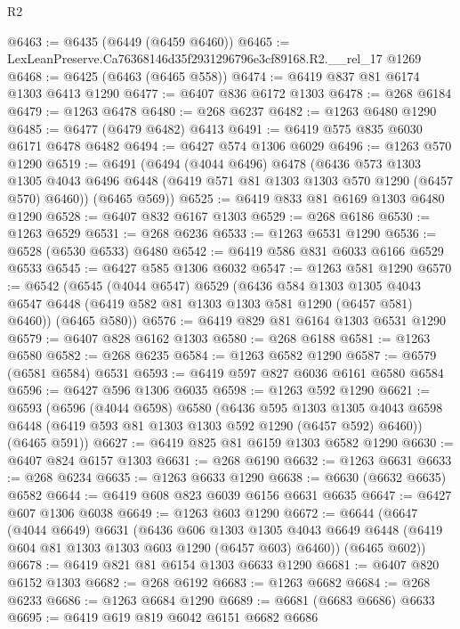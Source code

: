 \begin{lexlean}{R2}
\begin{coremodule}
@6463 := @6435 (@6449 (@6459 @6460))
@6465 := LexLeanPreserve.Ca76368146d35f2931296796e3cf89168.R2.__rel_17 @1269
@6468 := @6425 (@6463 (@6465 @558))
@6474 := @6419 @837 @81 @6174 @1303 @6413 @1290
@6477 := @6407 @836 @6172 @1303
@6478 := @268 @6184
@6479 := @1263 @6478
@6480 := @268 @6237
@6482 := @1263 @6480 @1290
@6485 := @6477 (@6479 @6482) @6413
@6491 := @6419 @575 @835 @6030 @6171 @6478 @6482
@6494 := @6427 @574 @1306 @6029
@6496 := @1263 @570 @1290
@6519 := @6491
    (@6494
      (@4044 @6496)
      @6478
      (@6436
        @573
        @1303
        @1305
        @4043
        @6496
        @6448
        (@6419 @571 @81 @1303 @1303 @570 @1290 (@6457 @570) @6460))
      (@6465 @569))
@6525 := @6419 @833 @81 @6169 @1303 @6480 @1290
@6528 := @6407 @832 @6167 @1303
@6529 := @268 @6186
@6530 := @1263 @6529
@6531 := @268 @6236
@6533 := @1263 @6531 @1290
@6536 := @6528 (@6530 @6533) @6480
@6542 := @6419 @586 @831 @6033 @6166 @6529 @6533
@6545 := @6427 @585 @1306 @6032
@6547 := @1263 @581 @1290
@6570 := @6542
    (@6545
      (@4044 @6547)
      @6529
      (@6436
        @584
        @1303
        @1305
        @4043
        @6547
        @6448
        (@6419 @582 @81 @1303 @1303 @581 @1290 (@6457 @581) @6460))
      (@6465 @580))
@6576 := @6419 @829 @81 @6164 @1303 @6531 @1290
@6579 := @6407 @828 @6162 @1303
@6580 := @268 @6188
@6581 := @1263 @6580
@6582 := @268 @6235
@6584 := @1263 @6582 @1290
@6587 := @6579 (@6581 @6584) @6531
@6593 := @6419 @597 @827 @6036 @6161 @6580 @6584
@6596 := @6427 @596 @1306 @6035
@6598 := @1263 @592 @1290
@6621 := @6593
    (@6596
      (@4044 @6598)
      @6580
      (@6436
        @595
        @1303
        @1305
        @4043
        @6598
        @6448
        (@6419 @593 @81 @1303 @1303 @592 @1290 (@6457 @592) @6460))
      (@6465 @591))
@6627 := @6419 @825 @81 @6159 @1303 @6582 @1290
@6630 := @6407 @824 @6157 @1303
@6631 := @268 @6190
@6632 := @1263 @6631
@6633 := @268 @6234
@6635 := @1263 @6633 @1290
@6638 := @6630 (@6632 @6635) @6582
@6644 := @6419 @608 @823 @6039 @6156 @6631 @6635
@6647 := @6427 @607 @1306 @6038
@6649 := @1263 @603 @1290
@6672 := @6644
    (@6647
      (@4044 @6649)
      @6631
      (@6436
        @606
        @1303
        @1305
        @4043
        @6649
        @6448
        (@6419 @604 @81 @1303 @1303 @603 @1290 (@6457 @603) @6460))
      (@6465 @602))
@6678 := @6419 @821 @81 @6154 @1303 @6633 @1290
@6681 := @6407 @820 @6152 @1303
@6682 := @268 @6192
@6683 := @1263 @6682
@6684 := @268 @6233
@6686 := @1263 @6684 @1290
@6689 := @6681 (@6683 @6686) @6633
@6695 := @6419 @619 @819 @6042 @6151 @6682 @6686

\end{coremodule}
\end{lexlean}
